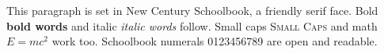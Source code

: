 \documentclass{article}
\begin{document}
This paragraph is set in New Century Schoolbook, a friendly serif face.
Bold \textbf{bold words} and italic \textit{italic words} follow.
Small caps \textsc{Small Caps} and math $E = mc^2$ work too.
Schoolbook numerals 0123456789 are open and readable.
\end{document}
